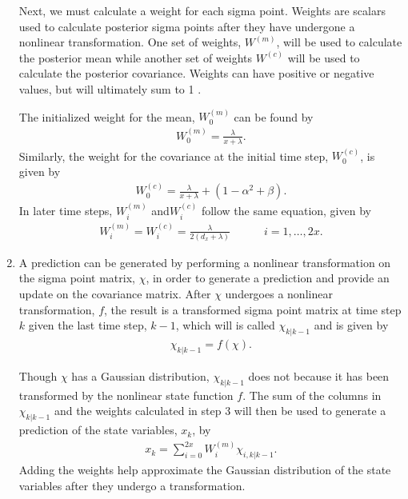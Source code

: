 \begin{enumerate}
        
\noindent Next, we must calculate a weight for each sigma point. Weights are scalars used to calculate posterior sigma points after they have undergone a nonlinear transformation. One set of weights,  $W^{(m)}$, will be used to calculate the posterior mean while another set of weights $W^{(c)}$ will be used to calculate the posterior covariance. Weights can have positive or negative values, but will ultimately sum to 1 \cite{article6}.
        
       The initialized weight for the mean, $W^{(m)}_{0} $ can be found by
            \begin{align*}
        W^{(m)}_{0} = \frac{\lambda}{x+ \lambda}.
         \end{align*}
        Similarly, the weight for the covariance at the initial time step, $W^{(c)}_{0}$, is given by
        \begin{align*}
        W^{(c)}_{0} = \frac{\lambda}{x+ \lambda} + (1 - \alpha^{2} + \beta).
         \end{align*}
          In later time steps, $W^{(m)}_{i} $ and$ W^{(c)}_{i}$ follow the same equation, given by
               \begin{align*}
        W^{(m)}_{i} = W^{(c)}_{i} = \frac{\lambda}{2(d_{x}+ \lambda) } \quad \quad \quad i=1,\dots,2x.
            \end{align*}
           
          
           
        \item A prediction can be generated by performing a nonlinear transformation on the sigma point matrix, $\chi$, in order to generate a prediction and provide an update on the covariance matrix. After $\chi$ undergoes a nonlinear transformation, $f$, the result is a transformed sigma point matrix at time step $k$ given the last time step, $k-1$, which will is called $\chi_{k | k - 1}$ and is given by
        \begin{align*}
        \chi_{k | k - 1} = f(\chi).
        \end{align*}
        
        
        Though $\chi$ has a Gaussian distribution,  $ \chi_{k | k - 1} $ does not because it has been transformed by the nonlinear state function $f$. The sum of the columns in $ \chi_{k | k - 1} $ and the weights calculated in step 3 will then be used to generate a prediction of the state variables, $x_k$, by 
        \begin{align*}
         x_{k} = \sum^{2x}_{i = 0} W_i^{(m)} \chi_{i, k | k - 1}.
        \end{align*}
       Adding the weights help approximate the Gaussian distribution of the state variables after they undergo a transformation. 
       

\end{enumerate}

